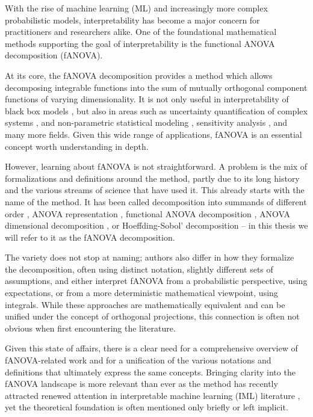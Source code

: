 With the rise of machine learning (ML) and increasingly more complex probabilistic models, interpretability has become a major concern for practitioners and researchers alike. One of the foundational mathematical methods supporting the goal of interpretability is the functional ANOVA decomposition (fANOVA).

At its core, the fANOVA decomposition provides a method which allows decomposing integrable functions into the sum of mutually orthogonal component functions of varying dimensionality.
It is not only useful in interpretability of black box models \citep{hooker2004, molnar2025}, 
but also in areas such as uncertainty quantification of complex systems \citep{rahman2014}, 
and non-parametric statistical modeling \citep[see, for example][]{stone1997}, sensitivity analysis \citep{sobol1993sensitivity}, and many more fields.
Given this wide range of applications, fANOVA is an essential concept worth understanding in depth.

However, learning about fANOVA is not straightforward. A problem is the mix of formalizations and definitions around the method, partly due to its long history and the various streams of science that have used it.
This already starts with the name of the method. It has been called decomposition into summands of different order \citep{sobol1993sensitivity}, ANOVA representation \citep{sobol2001}, functional ANOVA decomposition \citep{hooker2004}, ANOVA dimensional decomposition \citep{rahman2014}, or Hoeffding-Sobol' decomposition \citep{chastaing2012} – in this thesis we will refer to it as the fANOVA decomposition.

The variety does not stop at naming; authors also differ in how they formalize the decomposition, often using distinct notation, slightly different sets of assumptions, and either interpret fANOVA from a probabilistic perspective, using expectations, or from a more deterministic mathematical viewpoint, using integrals.
While these approaches are mathematically equivalent and can be unified under the concept of orthogonal projections, this connection is often not obvious when first encountering the literature.

Given this state of affairs, there is a clear need for a comprehensive overview of fANOVA-related work and for a unification of the various notations and definitions that ultimately express the same concepts.
Bringing clarity into the fANOVA landscape is more relevant than ever as the method has recently attracted renewed attention in interpretable machine learning (IML) literature \citep[see, for example][]{hu2025}, yet the theoretical foundation is often mentioned only briefly or left implicit.

